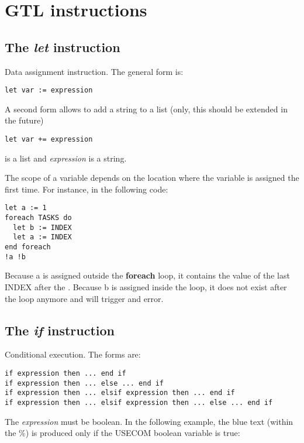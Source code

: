 \section{GTL instructions}

\subsection{The {\em let} instruction}

Data assignment instruction. The general form is:

\begin{lstlisting}
let var := expression
\end{lstlisting}

A second form allows to add a string to a list (only, this should be extended in the future)

\begin{lstlisting}
let var += expression
\end{lstlisting}

 is a list and {\em expression} is a string.

The scope of a variable depends on the location where the variable is assigned the first time. For instance, in the following code:

\begin{lstlisting}
let a := 1
foreach TASKS do
  let b := INDEX
  let a := INDEX
end foreach
!a !b
\end{lstlisting}

Because a is assigned outside the {\bf foreach} loop, it contains the value of the last INDEX after the . Because b is assigned inside the  loop, it does not exist after the loop anymore and  will trigger and error.


\subsection{The {\em if} instruction}

Conditional execution. The forms are:

\begin{lstlisting}
if expression then ... end if
if expression then ... else ... end if
if expression then ... elsif expression then ... end if
if expression then ... elsif expression then ... else ... end if
\end{lstlisting}    

The {\em expression} must be boolean. In the following example, the blue text (within the \%) is produced only if the USECOM boolean variable is true:

